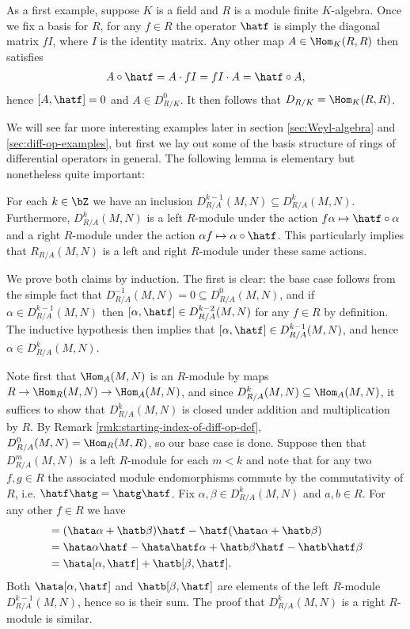 \begin{example}\label{example:module-finite-K-alg-diff-ops}
	As a first example, suppose $K$ is a field and $R$ is a module finite $K$-algebra. Once we fix a basis for $R$, for any $f \in R$ the operator $\hatf$ is simply the diagonal matrix $fI$, where $I$ is the identity matrix. Any other map $A \in \Hom_K(R,R)$ then satisfies
	\begin{align*}
		A\circ \hatf = A\cdot fI = fI\cdot A = \hatf\circ A,
	\end{align*}
	hence $[A,\hatf] = 0$ and $A \in D^0_{R/K}$. It then follows that $D_{R/K} = \Hom_K(R,R)$.
\end{example}

We will see far more interesting examples later in section \ref{sec:Weyl-algebra} and \ref{sec:diff-op-examples}, but first we lay out some of the basis structure of rings of differential operators in general. The following lemma is elementary but nonetheless quite important:
\begin{lem}\label{lem:fixed-order-ops-form-module}
	For each $k \in \bZ$ we have an inclusion $D^{k-1}_{R/A}(M,N) \subseteq D^k_{R/A}(M,N)$. Furthermore, $D^k_{R/A}(M,N)$ is a left $R$-module under the action $f\alpha \mapsto \hatf\circ \alpha$ and a right $R$-module under the action $\alpha f \mapsto \alpha \circ \hatf$. This particularly implies that $R_{R/A}(M,N)$ is a left and right $R$-module under these same actions.
\end{lem}
\begin{prf}
	We prove both claims by induction. The first is clear: the base case follows from the simple fact that $D^{-1}_{R/A}(M,N) = 0 \subseteq D^0_{R/A}(M,N)$, and if $\alpha \in D^{k-1}_{R/A}(M,N)$ then $[\alpha,\hatf] \in D^{k-2}_{R/A}(M,N)$ for any $f \in R$ by definition. The inductive hypothesis then implies that $[\alpha,\hatf] \in D^{k-1}_{R/A}(M,N)$, and hence $\alpha \in D^k_{R/A}(M,N)$.

	Note first that $\Hom_A(M,N)$ is an $R$-module by maps $R\to \Hom_R(M,N) \to \Hom_A(M,N)$, and since $D^k_{R/A}(M,N)\subseteq \Hom_A(M,N)$, it suffices to show that $D^k_{R/A}(M,N)$ is closed under addition and multiplication by $R$. By Remark \ref{rmk:starting-index-of-diff-op-def}, $D^0_{R/A}(M,N) = \Hom_R(M,R)$, so our base case is done. Suppose then that $D^m_{R/A}(M,N)$ is a left $R$-module for each $m < k$ and note that for any two $f,g\in R$ the associated module endomorphisms commute by the commutativity of $R$, i.e. $\hatf\hatg = \hatg\hatf$. Fix $\alpha,\beta \in D^k_{R/A}(M,N)$ and $a,b \in R$. For any other $f \in R$ we have
	\begin{align*}
		[\hata\alpha + \hatb\beta, \hatf] 
		  &= (\hata\alpha + \hatb\beta)\hatf - \hatf(\hata\alpha + \hatb\beta) \\
		  &= \hata\alpha\hatf - \hata\hatf\alpha + \hatb\beta\hatf - \hatb\hatf\beta \\
		  &= \hata[\alpha,\hatf] + \hatb[\beta,\hatf].
	\end{align*}
	Both $\hata[\alpha,\hatf]$ and $\hatb[\beta,\hatf]$ are elements of the left $R$-module $D^{k-1}_{R/A}(M,N)$, hence so is their sum. The proof that $D^k_{R/A}(M,N)$ is a right $R$-module is similar.
\end{prf}
